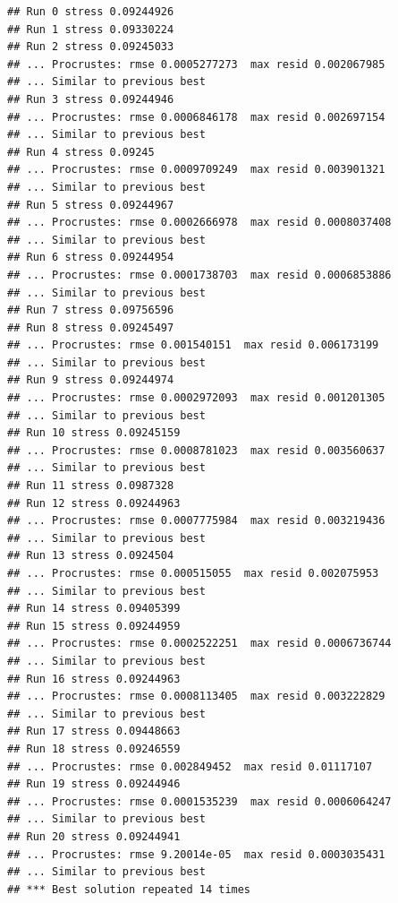 \documentclass[
]{article}
\begin{document}
\begin{verbatim}
## Run 0 stress 0.09244926 
## Run 1 stress 0.09330224 
## Run 2 stress 0.09245033 
## ... Procrustes: rmse 0.0005277273  max resid 0.002067985 
## ... Similar to previous best
## Run 3 stress 0.09244946 
## ... Procrustes: rmse 0.0006846178  max resid 0.002697154 
## ... Similar to previous best
## Run 4 stress 0.09245 
## ... Procrustes: rmse 0.0009709249  max resid 0.003901321 
## ... Similar to previous best
## Run 5 stress 0.09244967 
## ... Procrustes: rmse 0.0002666978  max resid 0.0008037408 
## ... Similar to previous best
## Run 6 stress 0.09244954 
## ... Procrustes: rmse 0.0001738703  max resid 0.0006853886 
## ... Similar to previous best
## Run 7 stress 0.09756596 
## Run 8 stress 0.09245497 
## ... Procrustes: rmse 0.001540151  max resid 0.006173199 
## ... Similar to previous best
## Run 9 stress 0.09244974 
## ... Procrustes: rmse 0.0002972093  max resid 0.001201305 
## ... Similar to previous best
## Run 10 stress 0.09245159 
## ... Procrustes: rmse 0.0008781023  max resid 0.003560637 
## ... Similar to previous best
## Run 11 stress 0.0987328 
## Run 12 stress 0.09244963 
## ... Procrustes: rmse 0.0007775984  max resid 0.003219436 
## ... Similar to previous best
## Run 13 stress 0.0924504 
## ... Procrustes: rmse 0.000515055  max resid 0.002075953 
## ... Similar to previous best
## Run 14 stress 0.09405399 
## Run 15 stress 0.09244959 
## ... Procrustes: rmse 0.0002522251  max resid 0.0006736744 
## ... Similar to previous best
## Run 16 stress 0.09244963 
## ... Procrustes: rmse 0.0008113405  max resid 0.003222829 
## ... Similar to previous best
## Run 17 stress 0.09448663 
## Run 18 stress 0.09246559 
## ... Procrustes: rmse 0.002849452  max resid 0.01117107 
## Run 19 stress 0.09244946 
## ... Procrustes: rmse 0.0001535239  max resid 0.0006064247 
## ... Similar to previous best
## Run 20 stress 0.09244941 
## ... Procrustes: rmse 9.20014e-05  max resid 0.0003035431 
## ... Similar to previous best
## *** Best solution repeated 14 times
\end{verbatim}
\end{document}
